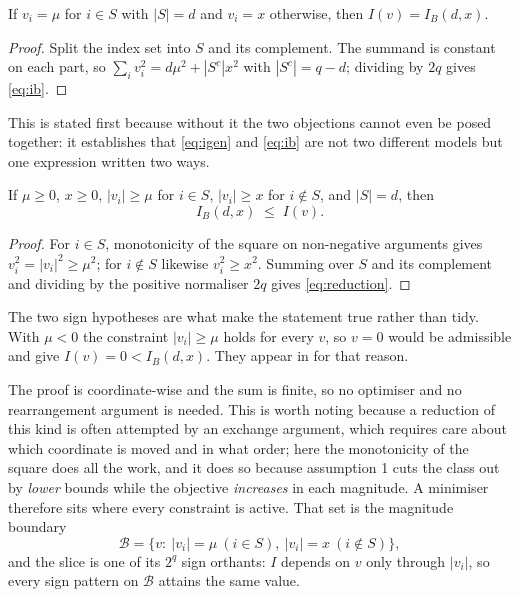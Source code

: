 \begin{theorem}
\label{thm:slice}
If $v_{i}=\mu$ for $i\in S$ with $|S|=d$ and $v_{i}=x$ otherwise, then $I(v)=I_{B}(d,x)$.
\end{theorem}

\begin{proof}
Split the index set into $S$ and its complement. The summand is constant on each part, so
$\sum_{i}v_{i}^{2}=d\mu^{2}+|S^{c}|x^{2}$ with $|S^{c}|=q-d$; dividing by $2q$ gives
\eqref{eq:ib}.
\end{proof}


This is stated first because without it the two objections cannot even be posed together: it
establishes that \eqref{eq:igen} and \eqref{eq:ib} are not two different models but one
expression written two ways.

\begin{theorem}
\label{thm:reduction}
If $\mu\ge0$, $x\ge0$, $|v_{i}|\ge\mu$ for $i\in S$, $|v_{i}|\ge x$ for $i\notin S$, and
$|S|=d$, then
\begin{equation}
I_{B}(d,x)\;\leq\;I(v).
\label{eq:reduction}
\end{equation}
\end{theorem}

\begin{proof}
For $i\in S$, monotonicity of the square on non-negative arguments gives
$v_{i}^{2}=|v_{i}|^{2}\ge\mu^{2}$; for $i\notin S$ likewise $v_{i}^{2}\ge x^{2}$. Summing over
$S$ and its complement and dividing by the positive normaliser $2q$ gives
\eqref{eq:reduction}.
\end{proof}


The two sign hypotheses are what make the statement true rather than tidy. With $\mu<0$ the
constraint $|v_{i}|\ge\mu$ holds for every $v$, so $v=0$ would be admissible and give
$I(v)=0<I_{B}(d,x)$. They appear in  for that reason.

The proof is coordinate-wise and the sum is finite, so no optimiser and no rearrangement
argument is needed. This is worth noting because a reduction of this kind is often attempted
by an exchange argument, which requires care about which coordinate is moved and in what
order; here the monotonicity of the square does all the work, and it does so because
assumption 1 cuts the class out by \emph{lower} bounds while the objective \emph{increases}
in each magnitude. A minimiser therefore sits where every constraint is active. That set is the magnitude
boundary
\begin{equation}
\mathcal{B}=\{v:\ |v_{i}|=\mu\ (i\in S),\ |v_{i}|=x\ (i\notin S)\},
\label{eq:boundary}
\end{equation}
and the slice is one of its $2^{q}$ sign orthants: $I$ depends on $v$ only through
$|v_{i}|$, so every sign pattern on $\mathcal{B}$ attains the same value.

